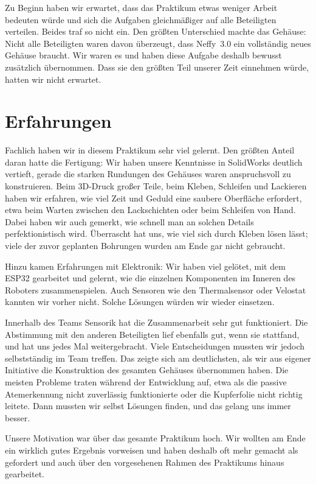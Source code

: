 Zu Beginn haben wir erwartet, dass das Praktikum etwas weniger Arbeit bedeuten würde und sich
die Aufgaben gleichmäßiger auf alle Beteiligten verteilen. Beides traf so nicht ein. Den
größten Unterschied machte das Gehäuse: Nicht alle Beteiligten waren davon überzeugt, dass
Neffy~3.0 ein vollständig neues Gehäuse braucht. Wir waren es und haben diese Aufgabe deshalb
bewusst zusätzlich übernommen. Dass sie den größten Teil unserer Zeit einnehmen würde,
hatten wir nicht erwartet.

\section{Erfahrungen}

Fachlich haben wir in diesem Praktikum sehr viel gelernt. Den größten Anteil daran hatte die
Fertigung: Wir haben unsere Kenntnisse in SolidWorks deutlich vertieft, gerade die starken
Rundungen des Gehäuses waren anspruchsvoll zu konstruieren. Beim 3D-Druck großer Teile, beim
Kleben, Schleifen und Lackieren haben wir erfahren, wie viel Zeit und Geduld eine saubere
Oberfläche erfordert, etwa beim Warten zwischen den Lackschichten oder beim Schleifen von Hand.
Dabei haben wir auch gemerkt, wie schnell man an solchen Details perfektionistisch wird.
Überrascht hat uns, wie viel sich durch Kleben lösen lässt; viele der zuvor geplanten
Bohrungen wurden am Ende gar nicht gebraucht.

Hinzu kamen Erfahrungen mit Elektronik: Wir haben viel gelötet, mit dem ESP32 gearbeitet und
gelernt, wie die einzelnen Komponenten im Inneren des Roboters zusammenspielen. Auch Sensoren
wie den Thermalsensor oder Velostat kannten wir vorher nicht. Solche Lösungen würden wir wieder
einsetzen.

Innerhalb des Teams Sensorik hat die Zusammenarbeit sehr gut funktioniert. Die Abstimmung mit
den anderen Beteiligten lief ebenfalls gut, wenn sie stattfand, und hat uns jedes Mal
weitergebracht. Viele Entscheidungen mussten wir jedoch selbstständig im Team treffen. Das
zeigte sich am deutlichsten, als wir aus eigener Initiative die Konstruktion des gesamten
Gehäuses übernommen haben. Die meisten Probleme traten während der Entwicklung auf, etwa als
die passive Atemerkennung nicht zuverlässig funktionierte oder die Kupferfolie nicht richtig
leitete. Dann mussten wir selbst Lösungen finden, und das gelang uns immer
besser.

Unsere Motivation war über das gesamte Praktikum hoch. Wir wollten am Ende ein wirklich gutes
Ergebnis vorweisen und haben deshalb oft mehr gemacht als gefordert und auch über den
vorgesehenen Rahmen des Praktikums hinaus gearbeitet.

